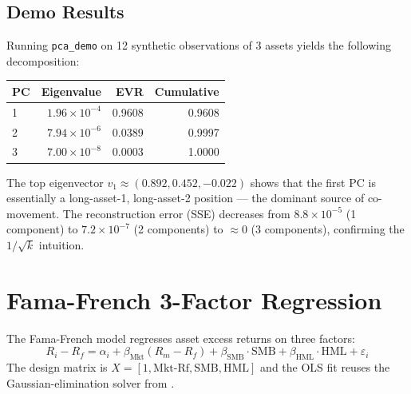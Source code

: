\subsection{Demo Results}

Running \texttt{pca\_demo} on 12 synthetic observations of 3 assets
yields the following decomposition:

\begin{center}
\begin{tabular}{lrrr}
\toprule
PC & Eigenvalue & EVR & Cumulative \\
\midrule
1 & $1.96 \times 10^{-4}$ & 0.9608 & 0.9608 \\
2 & $7.94 \times 10^{-6}$ & 0.0389 & 0.9997 \\
3 & $7.00 \times 10^{-8}$ & 0.0003 & 1.0000 \\
\bottomrule
\end{tabular}
\end{center}

The top eigenvector $v_1 \approx (0.892, 0.452, -0.022)$ shows that the
first PC is essentially a long-asset-1, long-asset-2 position ---
the dominant source of co-movement. The reconstruction error (SSE)
decreases from $8.8 \times 10^{-5}$ (1 component) to $7.2 \times 10^{-7}$
(2 components) to $\approx 0$ (3 components), confirming the
$1/\sqrt{k}$ intuition.

\section{Fama-French 3-Factor Regression}

The Fama-French model regresses asset excess returns on three factors:
\[
  R_i - R_f = \alpha_i + \beta_{\text{Mkt}} (R_m - R_f)
  + \beta_{\text{SMB}} \cdot \text{SMB}
  + \beta_{\text{HML}} \cdot \text{HML}
  + \varepsilon_i
\]
The design matrix is $X = [1, \text{Mkt-Rf}, \text{SMB}, \text{HML}]$
and the OLS fit reuses the Gaussian-elimination solver from
.



